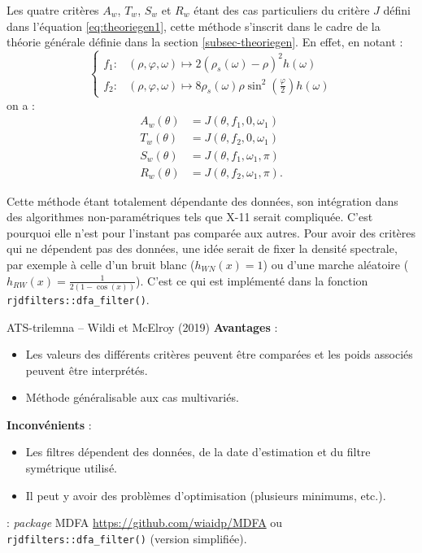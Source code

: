 \documentclass[
  12pt,
  a4paper,french]{article}
\newcommand\1{\mathds{1}}
\begin{document}
Les quatre critères \(A_w\), \(T_w\), \(S_w\) et \(R_w\) étant des cas particuliers du critère \(J\) défini dans l'équation \eqref{eq:theoriegen1}, cette méthode s'inscrit dans le cadre de la théorie générale définie dans la section \ref{subsec-theoriegen}.
En effet, en notant :
\[
\begin{cases}
    f_1\colon&(\rho,\varphi, \omega)\mapsto2\left(\rho_s(\omega)-\rho\right)^{2}h(\omega) \\
    f_2\colon&(\rho,\varphi, \omega)\mapsto8\rho_s(\omega)\rho\sin^{2}\left(\frac{\varphi}{2}\right)h(\omega)
\end{cases}
\]
on a :
\begin{align*}
A_w(\theta)&= J(\theta,f_1,0,\omega_1)\\
T_w(\theta)&= J(\theta,f_2,0,\omega_1)\\
S_w(\theta)&= J(\theta,f_1,\omega_1,\pi)\\
R_w(\theta)&= J(\theta,f_2,\omega_1,\pi).
\end{align*}

Cette méthode étant totalement dépendante des données, son intégration dans des algorithmes non-paramétriques tels que X-11 serait compliquée.
C'est pourquoi elle n'est pour l'instant pas comparée aux autres.
Pour avoir des critères qui ne dépendent pas des données, une idée serait de fixer la densité spectrale, par exemple à celle d'un bruit blanc (\(h_{WN}(x)=1\)) ou d'une marche aléatoire (\(h_{RW}(x)=\frac{1}{2(1-\cos(x))}\)).
C'est ce qui est implémenté dans la fonction \texttt{rjdfilters::dfa\_filter()}.

\begin{summary_box}{ATS-trilemna -- Wildi et McElroy (2019)}
\textbf{Avantages} :

\begin{itemize}
\item
  Les valeurs des différents critères peuvent être comparées et les poids associés peuvent être interprétés.
\item
  Méthode généralisable aux cas multivariés.
\end{itemize}

\textbf{Inconvénients }:

\begin{itemize}
\item
  Les filtres dépendent des données, de la date d'estimation et du filtre symétrique utilisé.
\item
  Il peut y avoir des problèmes d'optimisation (plusieurs minimums, etc.).
\end{itemize}

\textbf{} : \emph{package} MDFA \url{https://github.com/wiaidp/MDFA} ou \texttt{rjdfilters::dfa\_filter()} (version simplifiée).

\end{summary_box}
\end{document}
